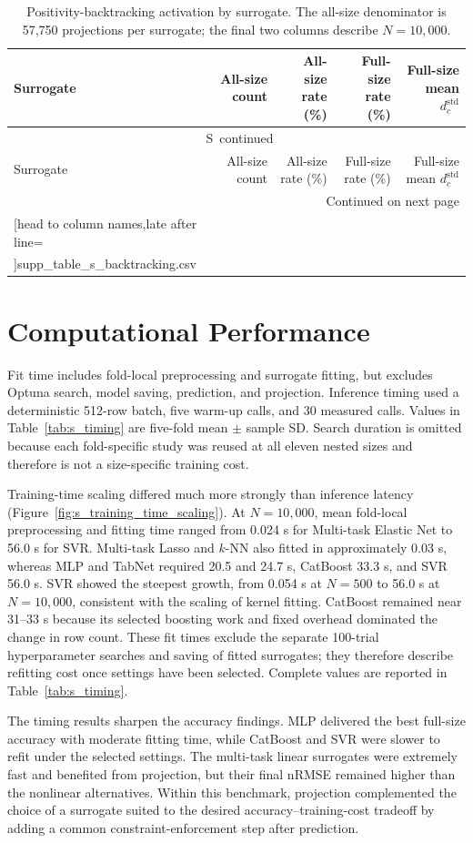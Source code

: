\documentclass[a4paper,10pt]{article}
\newcommand{\csvrowsfive}[1]{%
  \csvreader[head to column names,late after line=\\]{#1}{}{\colA & \colB & \colC & \colD & \colE}}
\newcommand{\csvlongtable}[7]{%
  \begin{longtable}{#1}
  \caption{#2}\label{#3}\\
  \toprule
  #5 \\
  \midrule
  \endfirsthead
  \multicolumn{#4}{c}{\tablename\ \thetable\ continued}\\
  \toprule
  #5 \\
  \midrule
  \endhead
  \midrule\multicolumn{#4}{r}{Continued on next page}\\
  \endfoot
  \bottomrule
  \endlastfoot
  #7{#6}
  \end{longtable}%
}
\renewcommand{\thetable}{S\arabic{table}}
\begin{document}
\begingroup
\small
\setlength{\tabcolsep}{4pt}
\csvlongtable
  {lrrrr}
  {Positivity-backtracking activation by surrogate. The all-size denominator is 57,750 projections per surrogate; the final two columns describe $N=10{,}000$.}
  {tab:s_backtracking}
  {5}
  {Surrogate & All-size count & All-size rate (\%) & Full-size rate (\%) & Full-size mean $d_c^{\mathrm{std}}$}
  {supp_table_s_backtracking.csv}
  {\csvrowsfive}
\endgroup

\section{Computational Performance}

Fit time includes fold-local preprocessing and surrogate fitting, but excludes Optuna search, model saving, prediction, and projection. Inference timing used a deterministic 512-row batch, five warm-up calls, and 30 measured calls. Values in Table~\ref{tab:s_timing} are five-fold mean $\pm$ sample SD. Search duration is omitted because each fold-specific study was reused at all eleven nested sizes and therefore is not a size-specific training cost.

Training-time scaling differed much more strongly than inference latency (Figure~\ref{fig:s_training_time_scaling}). At $N=10{,}000$, mean fold-local preprocessing and fitting time ranged from 0.024 s for Multi-task Elastic Net to 56.0 s for SVR. Multi-task Lasso and $k$-NN also fitted in approximately 0.03 s, whereas MLP and TabNet required 20.5 and 24.7 s, CatBoost 33.3 s, and SVR 56.0 s. SVR showed the steepest growth, from 0.054 s at $N=500$ to 56.0 s at $N=10{,}000$, consistent with the scaling of kernel fitting. CatBoost remained near 31--33 s because its selected boosting work and fixed overhead dominated the change in row count. These fit times exclude the separate 100-trial hyperparameter searches and saving of fitted surrogates; they therefore describe refitting cost once settings have been selected. Complete values are reported in Table~\ref{tab:s_timing}.

The timing results sharpen the accuracy findings. MLP delivered the best full-size accuracy with moderate fitting time, while CatBoost and SVR were slower to refit under the selected settings. The multi-task linear surrogates were extremely fast and benefited from projection, but their final nRMSE remained higher than the nonlinear alternatives. Within this benchmark, projection complemented the choice of a surrogate suited to the desired accuracy--training-cost tradeoff by adding a common constraint-enforcement step after prediction.
\end{document}
